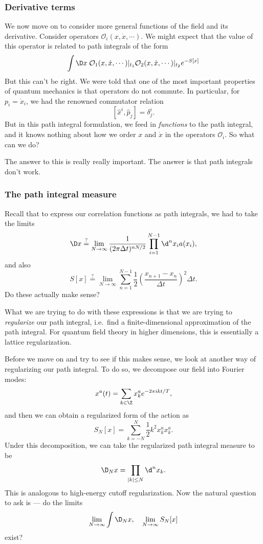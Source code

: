 \documentclass[a4paper]{article}
\begin{document}
\subsubsection*{Derivative terms}
We now move on to consider more general functions of the field and its derivative. Consider operators $\mathcal{O}_i(x, \dot{x}, \cdots)$. We might expect that the value of this operator is related to path integrals of the form
\[
  \int \D x\; \mathcal{O}_1(x, \dot{x}, \cdots)|_{t_1} \mathcal{O}_2(x, \dot{x}, \cdots)|_{t_2} e^{-S[x]}
\]
But this can't be right. We were told that one of the most important properties of quantum mechanics is that operators do not commute. In particular, for $p_i = \dot{x}_i$, we had the renowned commutator relation
\[
  [\hat{x}^i, \hat{p}_j] = \delta^i_j.
\]
But in this path integral formulation, we feed in \emph{functions} to the path integral, and it knows nothing about how we order $x$ and $\dot{x}$ in the operators $\mathcal{O}_i$. So what can we do?

The answer to this is really really important. The answer is that path integrals don't work.
\subsubsection*{The path integral measure}
Recall that to express our correlation functions as path integrals, we had to take the limits
\[
  \D x \overset{?}{=} \lim_{N \to \infty} \frac{1}{(2\pi \Delta t)^{nN/2}}\prod_{i = 1}^{N - 1} \d^n x_i a(x_i),
\]
and also
\[
  S[x] \overset{?}{=} \lim_{N \to \infty}\sum_{n = 1}^{N - 1} \frac{1}{2} \left(\frac{x_{n + 1} - x_n}{\Delta t}\right)^2 \Delta t.
\]
Do these actually make sense?

What we are trying to do with these expressions is that we are trying to \emph{regularize} our path integral, i.e.\ find a finite-dimensional approximation of the path integral. For quantum field theory in higher dimensions, this is essentially a lattice regularization.

Before we move on and try to see if this makes sense, we look at another way of regularizing our path integral. To do so, we decompose our field into Fourier modes:
\[
  x^a(t) = \sum_{k \in \Z} x_k^a e^{-2\pi i k t/T},
\]
and then we can obtain a regularized form of the action as
\[
  S_N[x] = \sum_{k = -N}^N \frac{1}{2} k^2 x^a_k x^a_k.
\]
Under this decomposition, we can take the regularized path integral measure to be
\[
  \D_N x = \prod_{|k| \leq N} \d^n x_k.
\]
This is analogous to high-energy cutoff regularization. Now the natural question to ask is --- do the limits
\[
  \lim_{N \to \infty} \int \D_N x,\quad \lim_{N \to \infty} S_N[x]
\]
exist?
\end{document}
